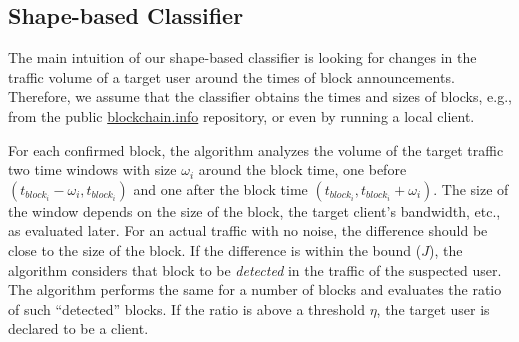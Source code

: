 \begin{comment}
\subsubsection{Downstream to upstream traffic volume ratio (\code{D2U})}
As we discussed in Appendix~\ref{sec:charachterzing_bc}, the ratio of downstream to upstream traffic volume is unique in \bc. This classifier looks at $t$ window of \bc traffic. The $t$ parameter should be at least $10$ minutes to include at least one block in it.
Then the downstream to upstream ratio is calculated for the target traffic. If the calculated ratio is smaller than a threshold, which is determined empirically, the traffic will be detected as \bc traffic. The threshold is defined in a way to distinguish \bc traffic from other traffic while minimizing false positive. This detection scheme will be effective even in the situation that the underlying system changes the packet sizes and packet timings, since the transmitted traffic volume in both directions would stay the same.
\end{comment}

\subsection{Shape-based Classifier}\label{window-sec}

The main intuition of our shape-based classifier is looking for changes in the traffic volume of a target user around the times of block announcements. Therefore, we assume that the classifier obtains the times and sizes of \bc blocks, e.g., from the public \url{blockchain.info} repository, or even by running a local \bc client.

For each confirmed \bc block, the algorithm analyzes the volume of the target traffic two time windows with size $\omega_i$ around the block time, 
one before $(t_{block_i}-\omega_i, t_{block_i})$ and one after the block time $(t_{block_i}, t_{block_i} +\omega_i)$. The size of the window depends on the size of the block, the target client's bandwidth, etc., as evaluated later. 
%
For an actual \bc traffic with no noise, the difference should be close to the size of the block. 
If the difference is within the bound ($J$), the algorithm considers that block to be \emph{detected} in the traffic of the suspected user. The algorithm performs the same for a number of blocks and evaluates the ratio of such ``detected'' blocks. 
If the ratio is above a threshold $\eta$, the target user is declared to be a \bc client. 


